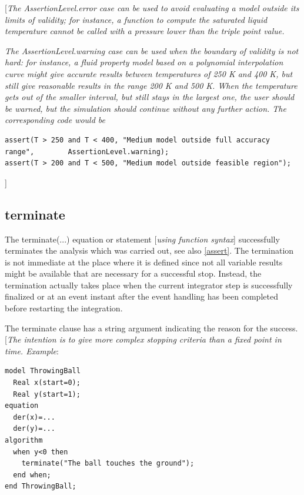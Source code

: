 \documentclass[10pt,a4paper]{report}
\def\doublelabel#1{\label{#1}\hypertarget{#1}{}}
\begin{document}
{[}\emph{The AssertionLevel.error case can be used to avoid evaluating a
model outside its limits of validity; for instance, a function to
compute the saturated liquid temperature cannot be called with a
pressure lower than the triple point value.}

\emph{The AssertionLevel.warning case can be used when the boundary of
validity is not hard: for instance, a fluid property model based on a
polynomial interpolation curve might give accurate results between
temperatures of 250 K and 400 K, but still give reasonable results in
the range 200 K and 500 K. When the temperature gets out of the smaller
interval, but still stays in the largest one, the user should be warned,
but the simulation should continue without any further action. The
corresponding code would be}

\begin{lstlisting}[language=modelica]
assert(T > 250 and T < 400, "Medium model outside full accuracy range",        AssertionLevel.warning); 
assert(T > 200 and T < 500, "Medium model outside feasible region"); 
\end{lstlisting}
{]}

\subsection{terminate}\doublelabel{terminate}

The terminate(...) equation or statement {[}\emph{using function
syntax}{]} successfully terminates the analysis which was carried out,
see also \ref{assert}. The termination is not immediate at the place
where it is defined since not all variable results might be available
that are necessary for a successful stop. Instead, the termination
actually takes place when the current integrator step is successfully
finalized or at an event instant after the event handling has been
completed before restarting the integration.

The terminate clause has a string argument indicating the reason for the
success. {[}\emph{The intention is to give more complex stopping
criteria than a fixed point in time. Example}:

\begin{lstlisting}[language=modelica]
model ThrowingBall  
  Real x(start=0);
  Real y(start=1);
equation
  der(x)=...
  der(y)=...
algorithm
  when y<0 then
    terminate("The ball touches the ground");
  end when;
end ThrowingBall;
\end{lstlisting}
\end{document}
